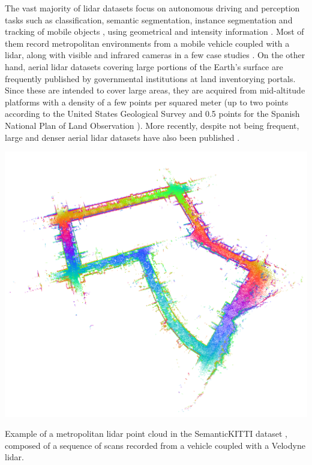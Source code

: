 The vast majority of \acrshort{lidar} datasets focus on autonomous driving and perception tasks such as classification, semantic segmentation, instance segmentation and tracking of mobile objects \cite{chen_automatic_2022}, using geometrical \cite{behley_towards_2021} and intensity information \cite{tan_toronto-3d_2020}. Most of them record metropolitan environments from a mobile vehicle coupled with a \acrshort{lidar}, along with visible and infrared cameras in a few case studies \cite{choi_kaist_2018}. On the other hand, aerial \acrshort{lidar} datasets covering large portions of the Earth's surface are frequently published by governmental institutions at land inventorying portals. Since these are intended to cover large areas, they are acquired from mid-altitude platforms with a density of a few points per squared meter (up to two points according to the United States Geological Survey \cite{us_geological_survey_lidar_2012} and 0.5 points for the Spanish National Plan of Land Observation \cite{instituto_geografico_de_informacion_geografica_pnoa_nodate}). More recently, despite not being frequent, large and denser aerial \acrshort{lidar} datasets have also been published \cite{varney_dales_2020}. 
\begin{marginfigure}[.0cm]
	\includegraphics{figs/context/kitty_scan.png}
	\caption{Example of a metropolitan \acrshort{lidar} point cloud in the SemanticKITTI dataset \cite{behley_towards_2021}, composed of a sequence of scans recorded from a vehicle coupled with a Velodyne \acrshort{lidar}.}
	\label{fig:kitty_scan}
\end{marginfigure}

